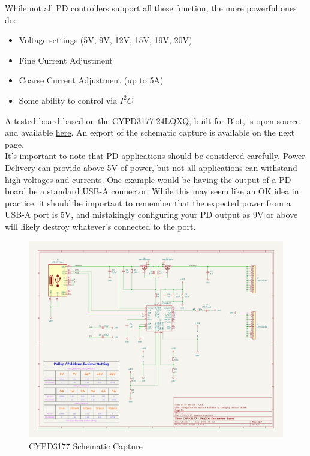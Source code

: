\documentclass[12pt]{article}
\begin{document}
\noindent
While not all PD controllers support all these function, the more powerful ones do:
\begin{itemize}
	\item Voltage settings (5V, 9V, 12V, 15V, 19V, 20V)
	\item Fine Current Adjustment 
	\item Coarse Current Adjustment (up to 5A)
	\item Some ability to control via $I^2 C$\\
\end{itemize}

\noindent
A tested board based on the CYPD3177-24LQXQ, built for \href{https://github.com/hackclub/blot/tree/main}{Blot}, is open source and available \href{https://github.com/Hugoyhu/CYPD3177-Breakout}{here}. An export of the schematic capture is available on the next page.\\

\noindent
It's important to note that PD applications should be considered carefully. Power Delivery can provide above 5V of power, but not all applications can withstand high voltages and currents. One example would be having the output of a PD board be a standard USB-A connector. While this may seem like an OK idea in practice, it should be important to remember that the expected power from a USB-A port is 5V, and mistakingly configuring your PD output as 9V or above will likely destroy whatever's connected to the port.
 
\newpage
\begin{figure}[h]
	\centering
	\includegraphics[width=\linewidth]{images/CYPD3177_sch.png}
	\caption{CYPD3177 Schematic Capture\protect\footnotemark}
	\label{fig:cypd3177_sch}
\end{figure}
\end{document}
